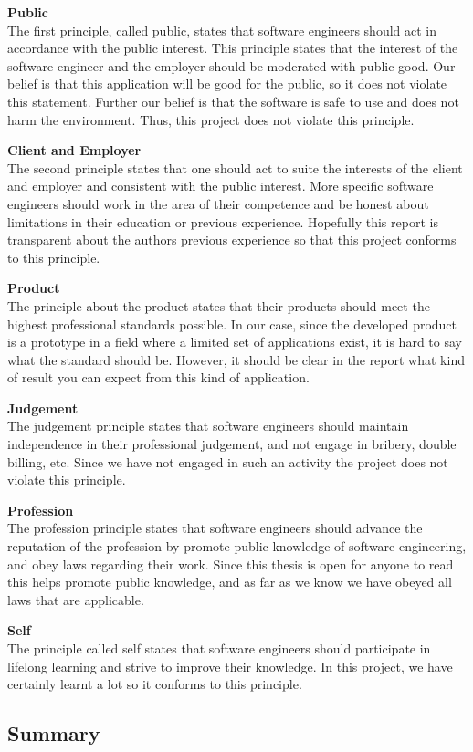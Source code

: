 \documentclass[12pt, a4paper, onecolumn]{article}
\newcommand{\parag}[1]{
	\textbf{#1} \hspace{0pt} \\
}
\begin{document}
	\parag{Public}
	The first principle, called public, states that software engineers should act in accordance with the public interest. This principle states that the interest of the software engineer and the employer should be moderated with public good. Our belief is that this application will be good for the public, so it does not violate this statement. Further our belief is that the software is safe to use and does not harm the environment. Thus, this project does not violate this principle.
	
	\parag{Client and Employer}
	The second principle states that one should act to suite the interests of the client and employer and consistent with the public interest. More specific software engineers should work in the area of their competence and be honest about limitations in their education or previous experience. Hopefully this report is transparent about the authors previous experience so that this project conforms to this principle.
	
	\parag{Product}
	The principle about the product states that their products should meet the highest professional standards possible. In our case, since the developed product is a prototype in a field where a limited set of applications exist, it is hard to say what the standard should be. However, it should be clear in the report what kind of result you can expect from this kind of application.
	
	\parag{Judgement}
	The judgement principle states that software engineers should maintain independence in their professional judgement, and not engage in bribery, double billing, etc. Since we have not engaged in such an activity the project does not violate this principle.
	
	\parag{Profession}
	The profession principle states that software engineers should advance the reputation of the profession by promote public knowledge of software engineering, and obey laws regarding their work. Since this thesis is open for anyone to read this helps promote public knowledge, and as far as we know we have obeyed all laws that are applicable.
	
	\parag{Self}
	The principle called self states that software engineers should participate in lifelong learning and strive to improve their knowledge. In this project, we have certainly learnt a lot so it conforms to this principle.
	
	\subsection{Summary}
	
\end{document}
